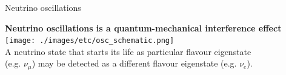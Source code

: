 %


%
%
%

\begin{frame}{Neutrino oscillations}

   \begin{center}
   {\bf Neutrino oscillations is a quantum-mechanical interference effect}\\
   \vspace{0.3cm}
   \texttt{[image: ./images/etc/osc\_schematic.png]}\\
   \vspace{0.3cm}
   A neutrino state that starts its life as particular flavour eigenstate\\ (e.g. $\nu_{\mu}$)
   may be detected as a different flavour eigenstate (e.g. $\nu_{e}$).\\
   \end{center}

\end{frame}


%
%
%

